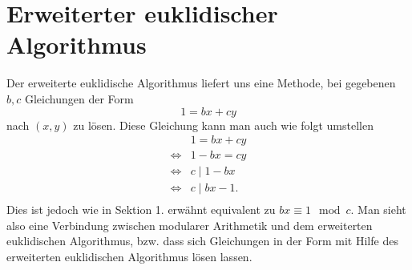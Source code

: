 \documentclass[11pt]{article}
\begin{document}
\pagebreak
\section{Erweiterter euklidischer Algorithmus}
Der erweiterte euklidische Algorithmus liefert uns eine Methode, bei gegebenen $b,c$ Gleichungen der Form
\[
    1 = bx + cy
\]
nach $(x,y)$ zu l\"osen. Diese Gleichung kann man auch wie folgt umstellen
\begin{align*}
    & 1 = bx + cy \\ 
    \iff & 1 - bx = cy \\ 
    \iff & c \mid 1 - bx \\ 
    \iff & c \mid bx - 1. \\ 
\end{align*}
Dies ist jedoch wie in Sektion 1. erw\"ahnt equivalent zu $bx \equiv 1 \mod c$. Man sieht also eine Verbindung zwischen modularer Arithmetik
und dem erweiterten euklidischen Algorithmus, bzw. dass sich Gleichungen in der Form mit Hilfe des erweiterten euklidischen Algorithmus l\"osen 
lassen.
\end{document}
